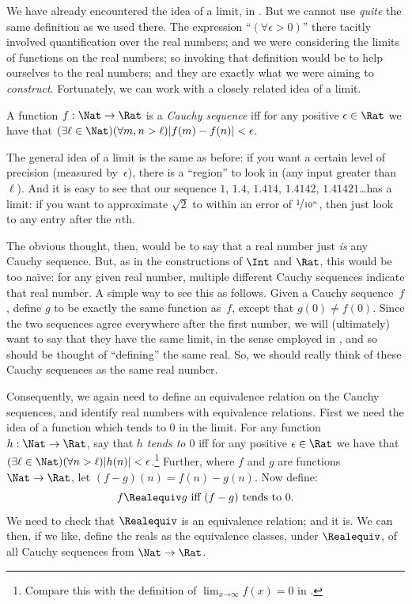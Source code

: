 We have already encountered the idea of a limit, in
. But we cannot use \emph{quite} the same
definition as we used there. The expression ``$(\forall \epsilon>0)$''
there tacitly involved quantification over the real numbers; and we
were considering the limits of functions on the real numbers; so
invoking that definition would be to help ourselves to the real
numbers; and they are exactly what we were aiming to \emph{construct}.
Fortunately, we can work with a closely related idea of a limit. 
\begin{defn}
  A function $f: \Nat \to \Rat$ is a \emph{Cauchy sequence} iff for
  any positive $\epsilon \in \Rat$ we have that $(\exists \ell \in
  \Nat)(\forall m, n > \ell)|f(m) - f(n)| < \epsilon$.
\end{defn}

The general idea of a limit is the same as before: if you want a
certain level of precision (measured by~$\epsilon$), there is a
``region'' to look in (any input greater than~$\ell$). And it is easy
to see that our sequence $1$, $1.4$, $1.414$, $1.4142$,
$1.41421$\ldots has a limit: if you want to approximate $\sqrt{2}$ to
within an error of $\nicefrac{1}{10^{n}}$, then just look to any entry
after the $n$th.

The obvious thought, then, would be to say that a real number just
\emph{is} any Cauchy sequence. But, as in the constructions of $\Int$
and $\Rat$, this would be too na\"{i}ve: for any given real number,
multiple different Cauchy sequences indicate that real number. A
simple way to see this as follows. Given a Cauchy sequence~$f$, define
$g$ to be exactly the same function as~$f$, except that $g(0)\neq
f(0)$. Since the two sequences agree everywhere after the first
number, we will (ultimately) want to say that they have the same
limit, in the sense employed in ,
and so should be thought of ``defining'' the same real. So, we should
really think of these Cauchy sequences as the same real number.

Consequently, we again need to define an equivalence relation on the
Cauchy sequences, and identify real numbers with equivalence
relations. First we need the idea of a function which tends to $0$ in
the limit. For any function $h : \Nat \to \Rat$, say that \emph{$h$
tends to $0$} iff for any positive $\epsilon \in \Rat$ we have that
$(\exists \ell \in \Nat)(\forall n > \ell)|h(n)| <
\epsilon$.\footnote{Compare this with the definition of $\lim_{x
\mathord{\rightarrow}\infty}f(x) = 0$ in
.} Further, where $f$ and $g$ are
functions $\Nat \to \Rat$, let $(f-g)(n) = f(n) - g(n)$. Now define:
\[
	f \Realequiv g \text{ iff $(f-g)$ tends to $0$}.
\]
We need to check that $\Realequiv$ is an equivalence relation; and it
is. We can then, if we like, define the reals as the equivalence
classes, under $\Realequiv$, of all Cauchy sequences from $\Nat \to
\Rat$.

